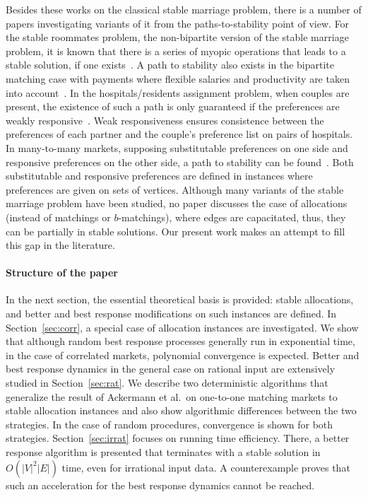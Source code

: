 \documentclass{llncs}
\begin{document}
Besides these works on the classical stable marriage problem, there is a number of papers investigating variants of it from the paths-to-stability point of view. For the stable roommates problem, the non-bipartite version of the stable marriage problem, it is known that there is a series of myopic operations that leads to a stable solution, if one exists~\cite{Diamantoudi200418}. A path to stability also exists in the bipartite matching case with payments where flexible salaries and productivity are taken into account~\cite{chen_decentr}. In the hospitals/residents assignment problem, when couples are present, the existence of such a path is only guaranteed if the preferences are weakly responsive~\cite{klaus_pts}. Weak responsiveness ensures consistence between the preferences of each partner and the couple's preference list on pairs of hospitals. In many-to-many markets, supposing substitutable preferences on one side and responsive preferences on the other side, a path to stability can be found~\cite{unver_kojima}. Both substitutable and responsive preferences are defined in instances where preferences are given on sets of vertices. Although many variants of the stable marriage problem have been studied, no paper discusses the case of allocations (instead of matchings or $b$-matchings), where edges are capacitated, thus, they can be partially in stable solutions. Our present work makes an attempt to fill this gap in the literature.

\paragraph{Structure of the paper} In the next section, the essential theoretical basis is provided: stable allocations, and better and best response modifications on such instances are defined. In Section~\ref{sec:corr}, a special case of allocation instances are investigated. We show that although random best response processes generally run in exponential time, in the case of correlated markets, polynomial convergence is expected. Better and best response dynamics in the general case on rational input are extensively studied in Section~\ref{sec:rat}. We describe two deterministic algorithms that generalize the result of Ackermann et al.\ on one-to-one matching markets to stable allocation instances and also show algorithmic differences between the two strategies. In the case of random procedures, convergence is shown for both strategies. Section~\ref{sec:irrat} focuses on running time efficiency. There, a better response algorithm is presented that terminates with a stable solution in $O(|V|^2|E|)$ time, even for irrational input data. A counterexample proves that such an acceleration for the best response dynamics cannot be reached. 
\end{document}
